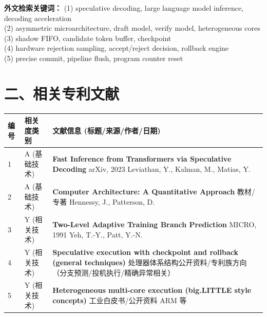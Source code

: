 \documentclass[12pt,a4paper]{article}
\begin{document}
\textbf{外文检索关键词：}
(1) speculative decoding, large language model inference, decoding acceleration \\
(2) asymmetric microarchitecture, draft model, verify model, heterogeneous cores \\
(3) shadow FIFO, candidate token buffer, checkpoint \\
(4) hardware rejection sampling, accept/reject decision, rollback engine \\
(5) precise commit, pipeline flush, program counter reset \\

\section*{二、相关专利文献}

\renewcommand{\arraystretch}{1.5}
\begin{longtable}{|p{1.5cm}|p{6cm}|p{7.5cm}|}
\hline
\textbf{编号} & \textbf{相关度类别} & \textbf{文献信息 (标题/来源/作者/日期)} \\
\hline
1 & A (基础技术) & \textbf{Fast Inference from Transformers via Speculative Decoding} \newline arXiv, 2023 \newline Leviathan, Y., Kalman, M., Matias, Y. \\
\hline
2 & A (基础技术) & \textbf{Computer Architecture: A Quantitative Approach} \newline 教材/专著 \newline Hennessy, J., Patterson, D. \\
\hline
3 & Y (相关技术) & \textbf{Two-Level Adaptive Training Branch Prediction} \newline MICRO, 1991 \newline Yeh, T.-Y., Patt, Y.-N. \\
\hline
4 & Y (相关技术) & \textbf{Speculative execution with checkpoint and rollback (general techniques)} \newline 处理器体系结构公开资料/专利族方向 \newline（分支预测/投机执行/精确异常相关） \\
\hline
5 & Y (相关技术) & \textbf{Heterogeneous multi-core execution (big.LITTLE style concepts)} \newline 工业白皮书/公开资料 \newline ARM 等 \\
\hline
\end{longtable}
\end{document}
